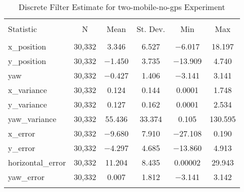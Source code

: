 
\begin{table}[h] \centering 
  \caption{Discrete Filter Estimate for two-mobile-no-gps Experiment} 
  \label{tab:two_mobile_no_gps_discrete_summary} 
\begin{tabular}{@{\extracolsep{5pt}}lccccc} 
\\[-1.8ex]\hline 
\hline \\[-1.8ex] 
Statistic & \multicolumn{1}{c}{N} & \multicolumn{1}{c}{Mean} & \multicolumn{1}{c}{St. Dev.} & \multicolumn{1}{c}{Min} & \multicolumn{1}{c}{Max} \\ 
\hline \\[-1.8ex] 
x\_position & 30,332 & 3.346 & 6.527 & $-$6.017 & 18.197 \\ 
y\_position & 30,332 & $-$1.450 & 3.735 & $-$13.909 & 4.740 \\ 
yaw & 30,332 & $-$0.427 & 1.406 & $-$3.141 & 3.141 \\ 
x\_variance & 30,332 & 0.124 & 0.144 & 0.0001 & 1.748 \\ 
y\_variance & 30,332 & 0.127 & 0.162 & 0.0001 & 2.534 \\ 
yaw\_variance & 30,332 & 55.436 & 33.374 & 0.105 & 130.595 \\ 
x\_error & 30,332 & $-$9.680 & 7.910 & $-$27.108 & 0.190 \\ 
y\_error & 30,332 & $-$4.297 & 4.685 & $-$13.860 & 4.913 \\ 
horizontal\_error & 30,332 & 11.204 & 8.435 & 0.00002 & 29.943 \\ 
yaw\_error & 30,332 & 0.007 & 1.812 & $-$3.141 & 3.142 \\ 
\hline \\[-1.8ex] 
\end{tabular} 
\end{table} 
